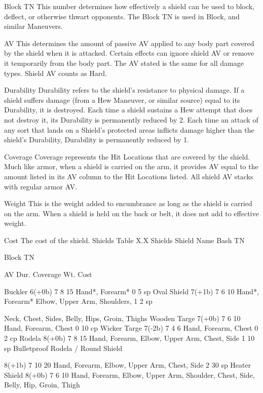 \documentclass[oneside,11pt,english]{book}
\begin{document}
 

Block TN 
This number determines how effectively a shield can be used to block, deflect, or otherwise thwart 
opponents. The Block TN is used in Block, and similar Maneuvers. 

 

AV 
This determines the amount of passive AV applied to any body part covered by the shield when it is 
attacked. Certain effects can ignore shield AV or remove it temporarily from the body part. The AV 
stated is the same for all damage types. 
Shield AV counts as Hard. 

 

Durability 
Durability refers to the shield’s resistance to physical damage. If a shield suffers damage (from a Hew 
Maneuver, or similar source) equal to its Durability, it is destroyed. Each time a shield sustains a Hew 
attempt that does not destroy it, its Durability is permanently reduced by 2. Each time an attack of any 
sort that lands on a Shield’s protected areas inflicts damage higher than the shield’s Durability, Durability 
is permanently reduced by 1. 
 
Coverage 
Coverage represents the Hit Locations that are covered by the shield. Much like armor, when a shield is 
carried on the arm, it provides AV equal to the amount listed in its AV column to the Hit Locations listed. 
All shield AV stacks with regular armor AV. 

 

Weight 
This is the weight added to encumbrance as long as the shield is carried on the arm. When a shield is held 
on the back or belt, it does not add to effective weight. 

 

Cost 
The cost of the shield. 
Shields 
Table X.X Shields 
Shield Name Bash 
TN 

Block 
TN 

AV Dur. Coverage Wt. Cost 

Buckler 6(+0b) 7 8 15 Hand*, Forearm* 0 5 sp 
Oval Shield 7(+1b) 7 6 10 Hand*, Forearm* Elbow, Upper Arm, Shoulders, 1 2 sp 


Neck, Chest, Sides, Belly, Hips, Groin, Thighs 
Wooden Targe 7(+0b) 7 6 10 Hand, Forearm, Chest 0 10 
cp 
Wicker Targe 7(-2b) 7 4 6 Hand, Forearm, Chest 0 2 cp 
Rodela 8(+0b) 7 8 15 Hand, Forearm, Elbow, Upper Arm, Chest, Side 1 10 
sp 
Bulletproof Rodela / 
Round Shield 

8(+1b) 7 10 20 Hand, Forearm, Elbow, Upper Arm, Chest, Side 2 30 
sp 
Heater Shield 8(+0b) 7 6 10 Hand, Forearm, Elbow, Upper Arm, Shoulder, Chest, 
Side, Belly, Hip, Groin, Thigh 
\end{document}

